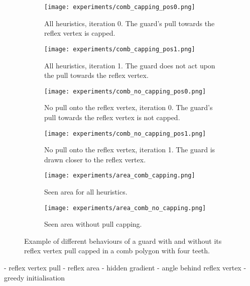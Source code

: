 \begin{figure}[h!]
    \centering
    \begin{subfigure}{0.45\textwidth}
        \texttt{[image: experiments/comb\_capping\_pos0.png]}
        \caption{All heuristics, iteration 0. The guard's pull towards the reflex vertex is capped.}
        \label{fig:all_cap_pos0}
    \end{subfigure}
    \hfill
    \begin{subfigure}{0.45\textwidth}
        \texttt{[image: experiments/comb\_capping\_pos1.png]}
        \caption{All heuristics, iteration 1. The guard does not act upon the pull towards the reflex vertex.}
        \label{fig:all_cap_pos1}
    \end{subfigure}
    \vfill
    \begin{subfigure}{0.45\textwidth}
        \texttt{[image: experiments/comb\_no\_capping\_pos0.png]}
        \caption{No pull onto the reflex vertex, iteration 0. The guard's pull towards the reflex vertex is not capped.}
        \label{fig:no_cap_pos0}
    \end{subfigure}
    \hfill
    \begin{subfigure}{0.45\textwidth}
        \texttt{[image: experiments/comb\_no\_capping\_pos1.png]}
        \caption{No pull onto the reflex vertex, iteration 1. The guard is drawn closer to the reflex vertex.}
        \label{fig:no_cap_pos1}
    \end{subfigure}
    \vfill
    \begin{subfigure}{0.45\textwidth}
        \texttt{[image: experiments/area\_comb\_capping.png]}
        \caption{Seen area for all heuristics.}
        \label{fig:area_all_cap}
    \end{subfigure}
    \hfill
    \begin{subfigure}{0.45\textwidth}
        \texttt{[image: experiments/area\_comb\_no\_capping.png]}
        \caption{Seen area without pull capping.}
        \label{fig:area_no_cap}
    \end{subfigure}
    \caption{Example of different behaviours of a guard with and without its reflex vertex pull capped in a comb polygon with four teeth.}
    \label{fig:no_capping}
\end{figure}


- reflex vertex pull
- reflex area
- hidden gradient
- angle behind reflex vertex
- greedy initialisation